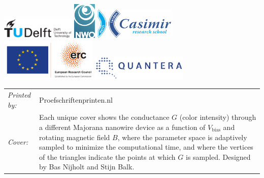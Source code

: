 \begin{titlepage}
\vspace{2\bigskipamount}
\begin{center}
    \includegraphics[height=0.4in]{title/logos/tudelft}
    \hspace{2em}
    \includegraphics[height=0.7in]{title/logos/nwo}
    \hspace{2em}
    \includegraphics[height=0.6in]{title/logos/casimir} \\
    \includegraphics[height=0.8in]{title/logos/eu-erc}
    \includegraphics[width=1.8in]{title/logos/quantera}
\end{center}

\vspace{1\bigskipamount}

\noindent
\begin{tabular}{@{}p{}@{}p{}}
    \textit{Printed by:} & Proefschriftenprinten.nl \\[\medskipamount]
    \textit{Cover:} & Each unique cover shows the conductance $G$ (color intensity) through a different Majorana nanowire device as a function of $V_\textrm{bias}$ and rotating magnetic field $B$, where the parameter space is adaptively sampled to minimize the computational time, and where the vertices of the triangles indicate the points at which $G$ is sampled.
    Designed by Bas Nijholt and Stijn Balk.
\end{tabular}


\end{titlepage}
